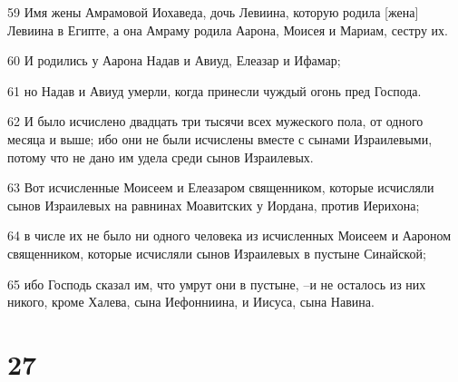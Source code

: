 \par 59 Имя жены Амрамовой Иохаведа, дочь Левиина, которую родила [жена] Левиина в Египте, а она Амраму родила Аарона, Моисея и Мариам, сестру их.
\par 60 И родились у Аарона Надав и Авиуд, Елеазар и Ифамар;
\par 61 но Надав и Авиуд умерли, когда принесли чуждый огонь пред Господа.
\par 62 И было исчислено двадцать три тысячи всех мужеского пола, от одного месяца и выше; ибо они не были исчислены вместе с сынами Израилевыми, потому что не дано им удела среди сынов Израилевых.
\par 63 Вот исчисленные Моисеем и Елеазаром священником, которые исчисляли сынов Израилевых на равнинах Моавитских у Иордана, против Иерихона;
\par 64 в числе их не было ни одного человека из исчисленных Моисеем и Аароном священником, которые исчисляли сынов Израилевых в пустыне Синайской;
\par 65 ибо Господь сказал им, что умрут они в пустыне, --и не осталось из них никого, кроме Халева, сына Иефонниина, и Иисуса, сына Навина.

\chapter{27}

